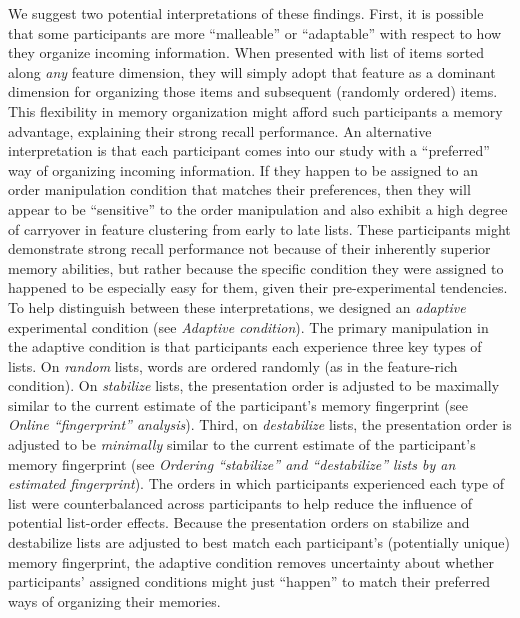 \documentclass[11pt]{article}
\begin{document}
We suggest two potential interpretations of these findings. First, it is
possible that some participants are more ``malleable'' or ``adaptable'' with
respect to how they organize incoming information. When presented with list of
items sorted along \textit{any} feature dimension, they will simply adopt that
feature as a dominant dimension for organizing those items and subsequent
(randomly ordered) items. This flexibility in memory organization might afford
such participants a memory advantage, explaining their strong recall
performance. An alternative interpretation is that each participant comes into
our study with a ``preferred'' way of organizing incoming information. If they
happen to be assigned to an order manipulation condition that matches their
preferences, then they will appear to be ``sensitive'' to the order
manipulation and also exhibit a high degree of carryover in feature clustering
from early to late lists. These participants might demonstrate strong recall
performance not because of their inherently superior memory abilities, but
rather because the specific condition they were assigned to happened to be
especially easy for them, given their pre-experimental tendencies. To help
distinguish between these interpretations, we designed an \textit{adaptive}
experimental condition (see \textit{Adaptive condition}). The primary
manipulation in the adaptive condition is that participants each experience
three key types of lists. On \textit{random} lists, words are ordered randomly
(as in the feature-rich condition). On \textit{stabilize} lists, the
presentation order is adjusted to be maximally similar to the current estimate
of the participant's memory fingerprint (see \textit{Online “fingerprint”
analysis}). Third, on \textit{destabilize} lists, the presentation order is
adjusted to be \textit{minimally} similar to the current estimate of the
participant's memory fingerprint (see \textit{Ordering ``stabilize'' and
``destabilize'' lists by an estimated fingerprint}). The orders in which
participants experienced each type of list were counterbalanced across
participants to help reduce the influence of potential list-order effects.
Because the presentation orders on stabilize and destabilize lists are adjusted
to best match each participant's (potentially unique) memory fingerprint, the
adaptive condition removes uncertainty about whether participants' assigned
conditions might just ``happen'' to match their preferred ways of organizing
their memories.
\end{document}
